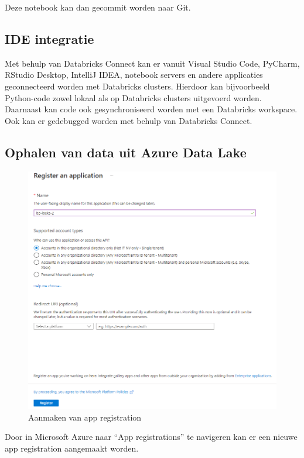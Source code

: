 Deze notebook kan dan gecommit worden naar Git.

\pagebreak

\subsection{IDE integratie}

Met behulp van Databricks Connect kan er vanuit Visual Studio Code, PyCharm, RStudio Desktop, IntelliJ IDEA, notebook servers en andere applicaties geconnecteerd worden met Databricks clusters. Hierdoor kan bijvoorbeeld Python-code zowel lokaal als op Databricks clusters uitgevoerd worden. Daarnaast kan code ook gesynchroniseerd worden met een Databricks workspace. Ook kan er gedebugged worden met behulp van Databricks Connect.

\subsection{Ophalen van data uit Azure Data Lake}
\label{sec:ophalen}

\begin{figure}[H]
    \centering
    \includegraphics[width=1\textwidth]{./graphics/databricks/connection_2.png}
    \caption{Aanmaken van app registration}
\end{figure}

Door in Microsoft Azure naar ``App registrations'' te navigeren kan er een nieuwe app registration aangemaakt worden.

